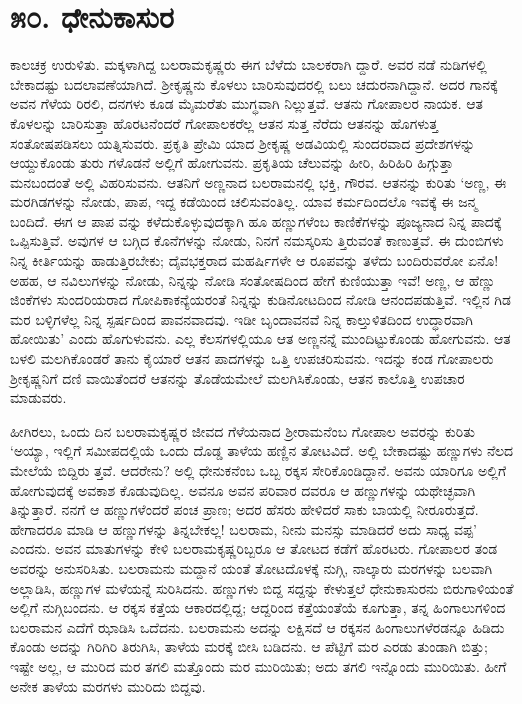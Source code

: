 
\chapter{೫೦. ಧೇನುಕಾಸುರ}

ಕಾಲಚಕ್ರ ಉರುಳಿತು. ಮಕ್ಕಳಾಗಿದ್ದ ಬಲರಾಮಕೃಷ್ಣರು ಈಗ ಬೆಳೆದು ಬಾಲಕರಾಗಿ ದ್ದಾರೆ. ಅವರ ನಡೆ ನುಡಿಗಳಲ್ಲಿ ಬೇಕಾದಷ್ಟು ಬದಲಾವಣೆಯಾಗಿದೆ. ಶ್ರೀಕೃಷ್ಣನು ಕೊಳಲು ಬಾರಿಸುವುದರಲ್ಲಿ ಬಲು ಚದುರನಾಗಿದ್ದಾನೆ. ಅದರ ಗಾನಕ್ಕೆ ಅವನ ಗೆಳೆಯ ರಿರಲಿ, ದನಗಳು ಕೂಡ ಮೈಮರೆತು ಮುಗ್ಧವಾಗಿ ನಿಲ್ಲುತ್ತವೆ. ಆತನು ಗೋಪಾಲರ ನಾಯಕ. ಆತ ಕೊಳಲನ್ನು ಬಾರಿಸುತ್ತಾ ಹೊರಟನೆಂದರೆ ಗೋಪಾಲಕರೆಲ್ಲ ಆತನ ಸುತ್ತ ನೆರೆದು ಆತನನ್ನು ಹೊಗಳುತ್ತ ಸಂತೋಷಪಡಿಸಲು ಯತ್ನಿಸುವರು. ಪ್ರಕೃತಿ ಪ್ರೇಮಿ ಯಾದ ಶ್ರೀಕೃಷ್ಣ ಅಡವಿಯಲ್ಲಿ ಸುಂದರವಾದ ಪ್ರದೇಶಗಳನ್ನು ಆಯ್ದುಕೊಂಡು ತುರು ಗಳೊಡನೆ ಅಲ್ಲಿಗೆ ಹೋಗುವನು. ಪ್ರಕೃತಿಯ ಚೆಲುವನ್ನು ಹೀರಿ, ಹಿರಿಹಿರಿ ಹಿಗ್ಗುತ್ತಾ ಮನಬಂದಂತೆ ಅಲ್ಲಿ ವಿಹರಿಸುವನು. ಆತನಿಗೆ ಅಣ್ಣನಾದ ಬಲರಾಮನಲ್ಲಿ ಭಕ್ತಿ, ಗೌರವ. ಆತನನ್ನು ಕುರಿತು ‘ಅಣ್ಣ, ಈ ಮರಗಿಡಗಳನ್ನು ನೋಡು, ಪಾಪ, ಇದ್ದ ಕಡೆಯಿಂದ ಚಲಿಸುವಂತಿಲ್ಲ. ಯಾವ ಕರ್ಮದಿಂದಲೊ ಇವಕ್ಕೆ ಈ ಜನ್ಮ ಬಂದಿದೆ. ಈಗ ಆ ಪಾಪ ವನ್ನು ಕಳೆದುಕೊಳ್ಳುವುದಕ್ಕಾಗಿ ಹೂ ಹಣ್ಣುಗಳೆಂಬ ಕಾಣಿಕೆಗಳನ್ನು ಪೂಜ್ಯನಾದ ನಿನ್ನ ಪಾದಕ್ಕೆ ಒಪ್ಪಿಸುತ್ತಿವೆ. ಅವುಗಳ ಆ ಬಗ್ಗಿದ ಕೊನೆಗಳನ್ನು ನೋಡು, ನಿನಗೆ ನಮಸ್ಕರಿಸು ತ್ತಿರುವಂತೆ ಕಾಣುತ್ತವೆ. ಈ ದುಂಬಿಗಳು ನಿನ್ನ ಕೀರ್ತಿಯನ್ನು ಹಾಡುತ್ತಿರಬೇಕು; ದೈವಭಕ್ತರಾದ ಮಹರ್ಷಿಗಳೇ ಆ ರೂಪವನ್ನು ತಳೆದು ಬಂದಿರುವರೋ ಏನೊ! ಅಹಹ, ಆ ನವಿಲುಗಳನ್ನು ನೋಡು, ನಿನ್ನನ್ನು ನೋಡಿ ಸಂತೋಷದಿಂದ ಹೇಗೆ ಕುಣಿಯುತ್ತಾ ಇವೆ! ಅಣ್ಣ, ಆ ಹೆಣ್ಣು ಜಿಂಕೆಗಳು ಸುಂದರಿಯರಾದ ಗೋಪಿಕಾಕನ್ಯೆಯರಂತೆ ನಿನ್ನನ್ನು ಕುಡಿನೋಟದಿಂದ ನೋಡಿ ಆನಂದಪಡುತ್ತಿವೆ. ಇಲ್ಲಿನ ಗಿಡ ಮರ ಬಳ್ಳಿಗಳೆಲ್ಲ ನಿನ್ನ ಸ್ಪರ್ಷದಿಂದ ಪಾವನವಾದವು. ಇಡೀ ಬೃಂದಾವನವೆ ನಿನ್ನ ಕಾಲ್ತುಳಿತದಿಂದ ಉದ್ಧಾರವಾಗಿ ಹೋಯಿತು’ ಎಂದು ಹೊಗುಳುವನು. ಎಲ್ಲ ಕೆಲಸಗಳಲ್ಲಿಯೂ ಆತ ಅಣ್ಣನನ್ನೆ ಮುಂದಿಟ್ಟುಕೊಂಡು ಹೋಗುವನು. ಆತ ಬಳಲಿ ಮಲಗಿಕೊಂಡರೆ ತಾನು ಕೈಯಾರೆ ಆತನ ಪಾದಗಳನ್ನು ಒತ್ತಿ ಉಪಚರಿಸುವನು. ಇದನ್ನು ಕಂಡ ಗೋಪಾಲರು ಶ್ರೀಕೃಷ್ಣನಿಗೆ ದಣಿ ವಾಯಿತೆಂದರೆ ಆತನನ್ನು ತೊಡೆಯಮೇಲೆ ಮಲಗಿಸಿಕೊಂಡು, ಆತನ ಕಾಲೊತ್ತಿ ಉಪಚಾರ ಮಾಡುವರು.

ಹೀಗಿರಲು, ಒಂದು ದಿನ ಬಲರಾಮಕೃಷ್ಣರ ಜೀವದ ಗೆಳೆಯನಾದ ಶ್ರೀರಾಮನೆಂಬ ಗೋಪಾಲ ಅವರನ್ನು ಕುರಿತು ‘ಅಯ್ಯಾ, ಇಲ್ಲಿಗೆ ಸಮೀಪದಲ್ಲಿಯೆ ಒಂದು ದೊಡ್ಡ ತಾಳೆಯ ಹಣ್ಣಿನ ತೋಟವಿದೆ. ಅಲ್ಲಿ ಬೇಕಾದಷ್ಟು ಹಣ್ಣುಗಳು ನೆಲದ ಮೇಲೆಯೆ ಬಿದ್ದಿರು ತ್ತವೆ. ಆದರೇನು? ಅಲ್ಲಿ ಧೇನುಕನೆಂಬ ಒಬ್ಬ ರಕ್ಕಸ ಸೇರಿಕೊಂಡಿದ್ದಾನೆ. ಅವನು ಯಾರಿಗೂ ಅಲ್ಲಿಗೆ ಹೋಗುವುದಕ್ಕೆ ಅವಕಾಶ ಕೊಡುವುದಿಲ್ಲ. ಅವನೂ ಅವನ ಪರಿವಾರ ದವರೂ ಆ ಹಣ್ಣುಗಳನ್ನು ಯಥೇಚ್ಛವಾಗಿ ತಿನ್ನುತ್ತಾರೆ. ನನಗೆ ಆ ಹಣ್ಣುಗಳೆಂದರೆ ಪಂಚ ಪ್ರಾಣ; ಅದರ ಹೆಸರು ಹೇಳಿದರೆ ಸಾಕು ಬಾಯಲ್ಲಿ ನೀರೂರುತ್ತದೆ. ಹೇಗಾದರೂ ಮಾಡಿ ಆ ಹಣ್ಣುಗಳನ್ನು ತಿನ್ನಬೇಕಲ್ಲ! ಬಲರಾಮ, ನೀನು ಮನಸ್ಸು ಮಾಡಿದರೆ ಅದು ಸಾಧ್ಯ ವಪ್ಪ’ ಎಂದನು. ಅವನ ಮಾತುಗಳನ್ನು ಕೇಳಿ ಬಲರಾಮಕೃಷ್ಣರಿಬ್ಬರೂ ಆ ತೋಟದ ಕಡೆಗೆ ಹೊರಟರು. ಗೋಪಾಲರ ತಂಡ ಅವರನ್ನು ಅನುಸರಿಸಿತು. ಬಲರಾಮನು ಮದ್ದಾನೆ ಯಂತೆ ತೋಟದೊಳಕ್ಕೆ ನುಗ್ಗಿ, ನಾಲ್ಕಾರು ಮರಗಳನ್ನು ಬಲವಾಗಿ ಅಲ್ಲಾಡಿಸಿ, ಹಣ್ಣುಗಳ ಮಳೆಯನ್ನೆ ಸುರಿಸಿದನು. ಹಣ್ಣುಗಳು ಬಿದ್ದ ಸದ್ದನ್ನು ಕೇಳುತ್ತಲೆ ಧೇನುಕಾಸುರನು ಬಿರುಗಾಳಿಯಂತೆ ಅಲ್ಲಿಗೆ ನುಗ್ಗಿಬಂದನು. ಆ ರಕ್ಕಸ ಕತ್ತೆಯ ಆಕಾರದಲ್ಲಿದ್ದ; ಆದ್ದರಿಂದ ಕತ್ತೆಯಂತೆಯೆ ಕೂಗುತ್ತಾ, ತನ್ನ ಹಿಂಗಾಲುಗಳಿಂದ ಬಲರಾಮನ ಎದೆಗೆ ಝಾಡಿಸಿ ಒದೆದನು. ಬಲರಾಮನು ಅದನ್ನು ಲಕ್ಷಿಸದೆ ಆ ರಕ್ಕಸನ ಹಿಂಗಾಲುಗಳೆರಡನ್ನೂ ಹಿಡಿದು ಕೊಂಡು ಅದನ್ನು ಗಿರಿಗಿರಿ ತಿರುಗಿಸಿ, ತಾಳೆಯ ಮರಕ್ಕೆ ಬೀಸಿ ಬಡಿದನು. ಆ ಪೆಟ್ಟಿಗೆ ಮರ ಎರಡು ತುಂಡಾಗಿ ಬಿತ್ತು; ಇಷ್ಟೇ ಅಲ್ಲ, ಆ ಮುರಿದ ಮರ ತಗಲಿ ಮತ್ತೊಂದು ಮರ ಮುರಿಯಿತು; ಅದು ತಗಲಿ ಇನ್ನೊಂದು ಮುರಿಯಿತು. ಹೀಗೆ ಅನೇಕ ತಾಳೆಯ ಮರಗಳು ಮುರಿದು ಬಿದ್ದವು.

